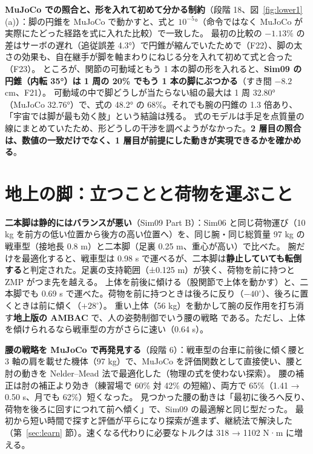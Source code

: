 \documentclass[paper=a4paper,fontsize=10pt,twocolumn,column_gap=2zw,line_length=24zw,number_of_lines=46,head_space=20mm]{jlreq}
\begin{document}
\textbf{MuJoCo での照合と、形を入れて初めて分かる制約}（段階 18、図~\ref{fig:lower1}(a)）：脚の円錐を MuJoCo で動かすと、式と $10^{-5}$°（命令ではなく MuJoCo が実際にたどった経路を式に入れた比較）で一致した。
最初の比較の $-1.13\%$ の差はサーボの遅れ（追従誤差 4.3°）で円錐が縮んでいたためで（F22）、脚の太さの効果も、自在継手が脚を軸まわりにねじる分を入れて初めて式と合った（F23）。
ところが、関節の可動域ともう 1 本の脚の形を入れると、\textbf{Sim09 の円錐（内転 35°）は 1 周の 20\% でもう 1 本の脚にぶつかる}（すき間 $-8.2$ cm、F21）。
可動域の中で脚どうしが当たらない組の最大は 1 周 32.80°（MuJoCo 32.76°）で、式の 48.2° の 68\%。それでも腕の円錐の 1.3 倍あり、「宇宙では脚が最も効く肢」という結論は残る。
式のモデルは手足を点質量の線にまとめていたため、形どうしの干渉を調べようがなかった。\textbf{2 層目の照合は、数値の一致だけでなく、1 層目が前提にした動きが実現できるかを確かめる}。

\section{地上の脚：立つことと荷物を運ぶこと}\label{sec:legground}

\textbf{二本脚は静的にはバランスが悪い}（Sim09 Part B）：Sim06 と同じ荷物運び（10 kg を前方の低い位置から後方の高い位置へ）を、同じ腕・同じ総質量 97 kg の戦車型（接地長 0.8 m）と二本脚（足裏 0.25 m、重心が高い）で比べた。
腕だけを最適化すると、戦車型は 0.98 s で運べるが、二本脚は\textbf{静止していても転倒する}と判定された。足裏の支持範囲（±0.125 m）が狭く、荷物を前に持つと ZMP がつま先を越える。
上体を前後に傾ける（股関節で上体を動かす）と、二本脚でも 0.69 s で運べた。荷物を前に持つときは後ろに反り（$-40^\circ$）、後ろに置くときは前に傾く（$+28^\circ$）。
重い上体（56 kg）を動かして腕の反作用を打ち消す\textbf{地上版の AMBAC} で、人の姿勢制御でいう腰の戦略 \cite{horak1986} である。ただし、上体を傾けられるなら戦車型の方がさらに速い（0.64 s）。

\textbf{腰の戦略を MuJoCo で再発見する}（段階 6）：戦車型の台車に前後に傾く腰と 3 軸の肩を載せた機体（97 kg）で、MuJoCo を評価関数として直接使い、腰と肘の動きを Nelder--Mead 法で最適化した（物理の式を使わない探索）。
腰の補正は肘の補正より効き（練習場で 60\% 対 42\% の短縮）、両方で 65\%（1.41 → 0.50 s、月でも 62\%）短くなった。
見つかった腰の動きは「最初に後ろへ反り、荷物を後ろに回すにつれて前へ傾く」で、Sim09 の最適解と同じ型だった。
最初から短い時間で探すと評価が平らになり探索が進まず、継続法で解決した（第~\ref{sec:learn} 節）。速くなる代わりに必要なトルクは 318 → 1102 N·m に増える。
\end{document}

